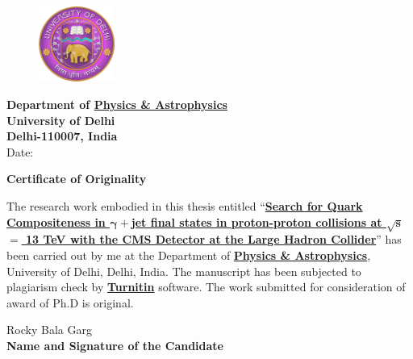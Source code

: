 
\begin{titlepage}

\begin{figure}[!h]
\raggedright
\includegraphics[width=2.5cm,height=2.5cm]{DU_logo.png}
\end{figure}

\vspace{-4cm}
\hspace*{-1cm}
\begin{flushright}
{\color{blue}\textbf{\large{Department of \underline{Physics \& Astrophysics}}}}\\
{\color{gray}\textbf{University of Delhi}} \\
{\color{gray}\textbf{Delhi-110007, India}} \\
\vspace{3cm}
Date:\underline{\hspace{2.5cm}}
\end{flushright}



\vspace*{10mm}
\begin{center}
{\large \textbf{Certificate of Originality}}
\end{center}

\doublespacing
The research work embodied in this thesis entitled ``\ul{\textbf{Search for Quark Compositeness in $\mathbold{\gamma}+$jet final states in proton-proton collisions
    at $\mathbold{\sqrt{s}}$ $=$ 13 TeV with the CMS Detector at the Large Hadron Collider}}'' has been carried out by me at the Department of
\ul{\textbf {Physics \& Astrophysics}}, University of Delhi, Delhi, India. The manuscript has 
been subjected to plagiarism check by \underline{\textbf {Turnitin}} software. The work submitted for consideration of award of Ph.D is original.

\vspace*{20mm}
\begin{flushright}
{\large Rocky Bala Garg} \\
\textbf{Name and Signature of the Candidate}
\end{flushright}


\end{titlepage}
